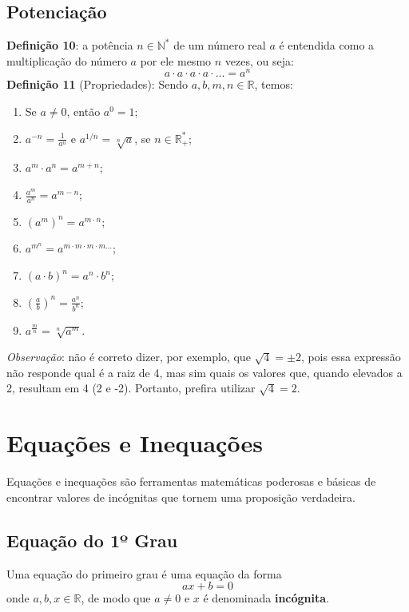\documentclass[13pt,letterpaper]{article}
\begin{document}
\subsection{Potenciação}
\textbf{Definição 10}: a potência $n \in \mathbb{N}^*$ de um número real $a$ é entendida como a multiplicação do número $a$ por ele mesmo $n$ vezes, ou seja:
\begin{displaymath}
    a \cdot a \cdot a \cdot a \cdot ... = a^n
\end{displaymath}
\textbf{Definição 11} (Propriedades): Sendo $a, b, m, n \in \mathbb{R}$, temos:
\begin{enumerate}
    \item Se $a \ne 0$, então $a^0 = 1$;
    \item $a^{-n} = \frac{1}{a^n}$ e $a^{1/n} = \sqrt[n]{a}$, se $n \in \mathbb{R}^*_+$;
    \item $a^m \cdot a^n = a^{m+n}$;
    \item $\frac{a^m}{a^n} = a^{m-n}$;
    \item $(a^m)^n = a^{m \cdot n}$;
    \item $a^{m^n} = a^{m \cdot m \cdot m \cdot m ...}$;
    \item $(a \cdot b)^n = a^n \cdot b^n$;
    \item $(\frac{a}{b})^n = \frac{a^n}{b^n}$;
    \item $a^{\frac{m}{n}} = \sqrt[n]{a^m}$.
\end{enumerate}

\emph{Observação}: não é correto dizer, por exemplo, que $\sqrt{4} = \pm 2$, pois essa expressão não responde qual é a raiz de 4, mas sim quais os valores que, quando elevados a 2, resultam em 4 (2 e -2).  Portanto, prefira utilizar $\sqrt{4} = 2$.
\newpage

\section{Equações e Inequações}
Equações e inequações são ferramentas matemáticas poderosas e básicas de encontrar valores de incógnitas que tornem uma proposição verdadeira. 

\subsection{Equação do 1º Grau}
Uma equação do primeiro grau é uma equação da forma
\begin{displaymath}
    ax + b = 0
\end{displaymath}
onde $a, b, x  \in \mathbb{R}$, de modo que $a \ne 0$ e $x$ é denominada \textbf{incógnita}.
\end{document}
